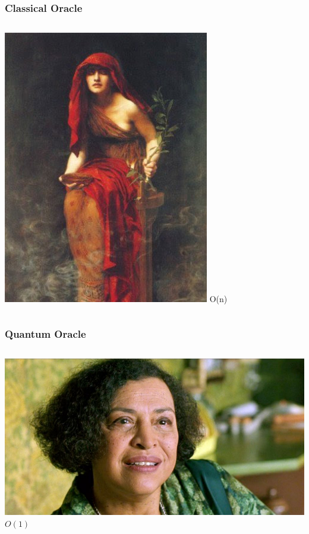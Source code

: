 \documentclass[aspectratio=169,11pt,hyperref={colorlinks=true}]{beamer}
\begin{document}
\begin{frame}
    \frametitle{Classical Oracle}
	\begin{columns}
              \centering
              \includegraphics[width=\textwidth]{the_oracle.jpg}
			O(n)
	\end{columns}
\end{frame}

\begin{frame}
    \frametitle{Quantum Oracle}
	\begin{columns}   
                \centering
                \includegraphics[width=\textwidth]{quantum_oracle.jpg}
			$O(1)$
	\end{columns}
\end{frame}
\end{document}
